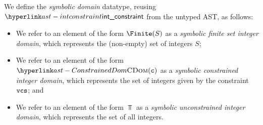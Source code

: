 We define the \emph{symbolic domain} datatype, reusing $\intconstraint$ from the untyped AST,
as follows:



\begin{itemize}
  \item We refer to an element of the form $\Finite(S)$ as a \emph{symbolic finite set integer domain},
        which represents the (non-empty) set of integers $S$;
  \item We refer to an element of the form $\ConstrainedDom(\vc)$ as a \emph{symbolic constrained integer domain},
        which represents the set of integers given by the constraint $\texttt{vcs}$; and
  \item We refer to an element of the form $\Top$ as a \emph{symbolic unconstrained integer domain},
        which represents the set of all integers.
\end{itemize}

